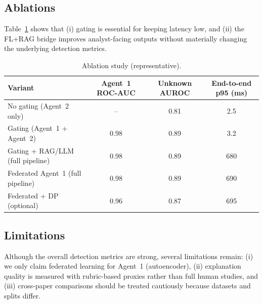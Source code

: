 \subsection{Ablations}
\label{sec:ablations}

Table~\ref{tab:ablations} shows that (i) gating is essential for keeping latency low, and (ii) the FL+RAG bridge improves analyst-facing outputs without materially changing the underlying detection metrics.

\begin{table}[t]
\caption{Ablation study (representative).}
\label{tab:ablations}
\centering
\begin{tabular}{lccc}
\toprule
\textbf{Variant} & \textbf{Agent~1 ROC-AUC} & \textbf{Unknown AUROC} & \textbf{End-to-end p95 (ms)}\\
\midrule
No gating (Agent~2 only) & -- & 0.81 & 2.5\\
Gating (Agent~1 + Agent~2) & 0.98 & 0.89 & 3.2\\
Gating + RAG/LLM (full pipeline) & 0.98 & 0.89 & 680\\
Federated Agent~1 (full pipeline) & 0.98 & 0.89 & 690\\
Federated + DP (optional) & 0.96 & 0.87 & 695\\
\bottomrule
\end{tabular}
\end{table}

\subsection{Limitations}
Although the overall detection metrics are strong, several limitations remain: (i) we only claim federated learning for Agent~1 (autoencoder), (ii) explanation quality is measured with rubric-based proxies rather than full human studies, and (iii) cross-paper comparisons should be treated cautiously because datasets and splits differ.


